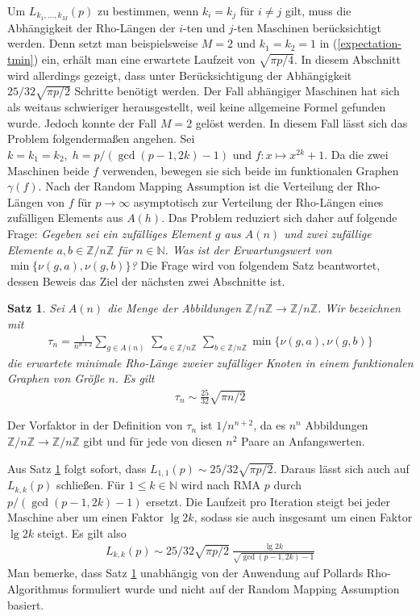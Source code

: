 \documentclass[a4paper, 11pt, ngerman]{article}
\newcommand{\N}{\mathbb{N}}
\newcommand{\Z}{\mathbb{Z}}
\theoremstyle{definition}
\theoremstyle{plain}
\newtheorem{theorem}{Satz}
\theoremstyle{remark}
\begin{document}
Um $L_{k_1, \dots, k_M}(p)$ zu bestimmen, wenn $k_i = k_j$ für $i \ne j$ gilt, muss die Abhängigkeit der Rho-Längen der $i$-ten und $j$-ten Maschinen berücksichtigt werden. Denn setzt man beispielsweise $M = 2$ und $k_1 = k_2 = 1$ in (\ref{expectation-tmin}) ein, erhält man eine erwartete Laufzeit von $\sqrt {\pi p / 4}$. In diesem Abschnitt wird allerdings gezeigt, dass unter Berücksichtigung der Abhängigkeit $25/32 \sqrt{\pi p / 2}$ Schritte benötigt werden. Der Fall abhängiger Maschinen hat sich als weitaus schwieriger herausgestellt, weil keine allgemeine Formel gefunden wurde. Jedoch konnte der Fall $M = 2$ gelöst werden. In diesem Fall lässt sich das Problem folgendermaßen angehen. Sei $k = k_1 = k_2, \; h = p/(\gcd(p - 1, 2k) - 1)$ und $f : x \mapsto x^{2k} + 1$. Da die zwei Maschinen beide $f$ verwenden, bewegen sie sich beide im funktionalen Graphen $\gamma(f)$. Nach der Random Mapping Assumption ist die Verteilung der Rho-Längen von $f$ für $p \to \infty$ asymptotisch zur Verteilung der Rho-Längen eines zufälligen Elements aus $A(h)$. Das Problem reduziert sich daher auf folgende Frage: \emph{Gegeben sei ein zufälliges Element $g$ aus $A(n)$ und zwei zufällige Elemente $a, b \in \Z/n\Z$ für $n \in \N$. Was ist der Erwartungswert von $\min\{\nu(g, a), \nu(g, b)\}$?} Die Frage wird von folgendem Satz beantwortet, dessen Beweis das Ziel der nächsten zwei Abschnitte ist.

\begin{theorem}
    \label{theorem:min-rho-len-m2}
    Sei $A(n)$ die Menge der Abbildungen $\Z/n\Z \to \Z/n\Z$. Wir bezeichnen mit
    \begin{align*}
        \tau_n =  \frac 1 {n^{n + 2}}
        \sum_{g \in A(n)} \, \sum_{a \in \Z/n\Z} \, \sum_{b \in \Z/n\Z}
        \min\{\nu(g, a), \nu(g, b)\}
    \end{align*}
    die erwartete minimale Rho-Länge zweier zufälliger Knoten in einem funktionalen Graphen von Größe $n$. Es gilt
    \begin{align*}
        \tau_n \sim \frac {25} {32} \sqrt{\pi n / 2}
    \end{align*}
\end{theorem}

\noindent Der Vorfaktor in der Definition von $\tau_n$ ist $1/n^{n + 2}$, da es $n^n$ Abbildungen $\Z/n\Z \to \Z/n\Z$ gibt und für jede von diesen $n^2$ Paare an Anfangswerten.

\noindent Aus Satz \ref{theorem:min-rho-len-m2} folgt sofort, dass $L_{1, 1}(p) \sim 25/32 \sqrt{\pi p / 2}$. Daraus lässt sich auch auf $L_{k, k}(p)$ schließen. Für $1 \le k \in \N$ wird nach RMA $p$ durch $p/(\gcd(p - 1, 2k) - 1)$ ersetzt. Die Laufzeit pro Iteration steigt bei jeder Maschine aber um einen Faktor $\lg 2k$, sodass sie auch insgesamt um einen Faktor $\lg 2k$ steigt. Es gilt also
\begin{align}
    L_{k, k}(p) \sim 25 / 32 \sqrt{\pi p /2} \
    \frac {\lg 2k} {\sqrt{\gcd(p - 1, 2k) - 1}}
    \label{lkkp}
\end{align}
Man bemerke, dass Satz \ref{theorem:min-rho-len-m2} unabhängig von der Anwendung auf Pollards Rho-Algorithmus formuliert wurde und nicht auf der Random Mapping Assumption basiert.
\end{document}
